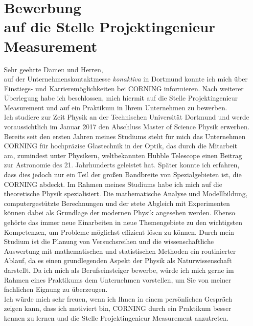 \documentclass[12pt]{scrartcl}
\begin{document}
\pagestyle{empty}

\section*{Bewerbung \\
auf die Stelle Projektingenieur Measurement}

\vspace{0.7in}

Sehr geehrte Damen und Herren,
\\

auf der Unternehmenskontaktmesse \textit{konaktiva} in Dortmund konnte 
ich mich über Ein\-stiegs- und 
Karrieremöglichkeiten bei CORNING informieren. Nach 
weiterer Überlegung habe ich beschlossen, mich hiermit auf 
die Stelle Projektingenieur Measurement und auf ein Praktikum in 
Ihrem Unternehmen zu bewerben.
\\

Ich studiere zur Zeit Physik an der Technischen Universität Dortmund und 
werde voraussichtlich im Januar 2017 den Abschluss Master of Science Physik 
erwerben. Bereits seit den ersten Jahren meines Studiums steht für mich 
das Unternehmen CORNING für hochpräzise Glastechnik in der Optik, das durch 
die Mitarbeit am, zumindest unter Physikern, weltbekannten Hubble Telescope 
einen Beitrag zur Astronomie des 21. Jahrhunderts geleistet hat. Später konnte 
ich erfahren, dass dies jedoch nur ein Teil der großen Bandbreite von 
Spezialgebieten ist, die CORNING abdeckt. Im Rahmen meines Studiums habe ich 
mich auf die theoretische Physik spezialisiert. Die mathematische Analyse und 
Modellbildung, computergestützte Berechnungen und der stete Abgleich mit 
Experimenten können dabei als Grundlage der modernen Physik 
angesehen werden. Ebenso gehörte das immer neue Einarbeiten in 
neue Themengebiete zu den wichtigsten Kompetenzen, um Probleme möglichst 
effizient lösen zu können. Durch mein Studium ist die Planung von 
Versuchsreihen und die wissenschaftliche Auswertung mit mathematischen und 
statistischen Methoden ein routinierter Ablauf, da es einen grundlegenden 
Aspekt der Physik als Naturwissenschaft darstellt. Da ich mich als Berufseinsteiger bewerbe, würde ich mich gerne 
im Rahmen eines Praktikums dem Unternehmen vorstellen, um Sie von meiner 
fachlichen Eignung zu überzeugen.
\\

Ich würde mich sehr freuen, wenn ich Ihnen in einem persönlichen Gespräch 
zeigen kann, dass ich motiviert bin, CORNING durch ein Praktikum 
besser kennen zu lernen und die Stelle Projektingenieur Measurement 
anzutreten.
\\
\end{document}
